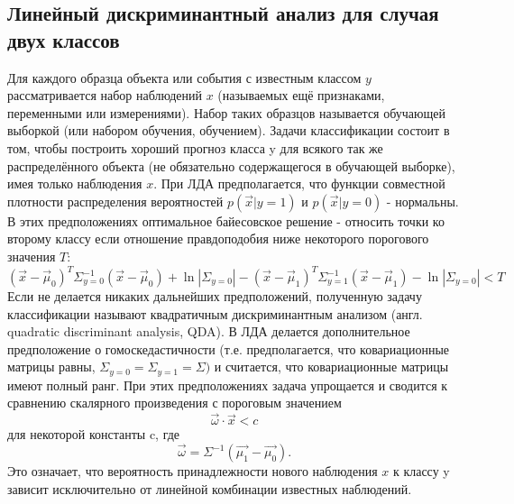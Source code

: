 \documentclass[a4paper,12pt]{article}
\theoremstyle{plain}
\begin{document}
\subsection{Линейный дискриминантный анализ для случая двух классов}
Для каждого образца объекта или события с известным классом $y$ рассматривается набор наблюдений $x$ (называемых ещё признаками, переменными или измерениями). Набор таких образцов называется обучающей выборкой (или набором обучения, обучением). Задачи классификации состоит в том, чтобы построить хороший прогноз класса y для всякого так же распределённого объекта (не обязательно содержащегося в обучающей выборке), имея только наблюдения $x$.\newline
При ЛДА предполагается, что функции совместной плотности распределения вероятностей $p(\vec{x}|y=1)$ и $p(\vec{x}|y=0)$ - нормальны. В этих предположениях оптимальное байесовское решение - относить точки ко второму классу если отношение правдоподобия ниже некоторого порогового значения $T$: $$(\vec{x}-\vec{\mu}_0)^T\Sigma_{y=0}^{-1}(\vec{x}-\vec{\mu}_0)+\ln{|\Sigma _{y=0}|}-(\vec{x}-\vec{\mu}_1)^T\Sigma _{y=1}^{-1}(\vec{x}-\vec{\mu}_1)-\ln{|\Sigma_{y=0}|}<T $$
Если не делается никаких дальнейших предположений, полученную задачу классификации называют квадратичным дискриминантным анализом (англ. quadratic discriminant analysis, QDA). В ЛДА делается дополнительное предположение о гомоскедастичности (т.е. предполагается, что ковариационные матрицы равны, $\Sigma_{y=0}=\Sigma_{y=1}=\Sigma)$ и считается, что ковариационные матрицы имеют полный ранг. При этих предположениях задача упрощается и сводится к сравнению скалярного произведения с пороговым значением 
$$\vec{\omega}\cdot\vec{x}<c $$
для некоторой константы c, где 
$$\vec{\omega}=\Sigma^{-1}(\vec{\mu_1}-\vec{\mu_0}). $$
Это означает, что вероятность принадлежности нового наблюдения $x$ к классу y зависит исключительно от линейной комбинации известных наблюдений.
\end{document}
